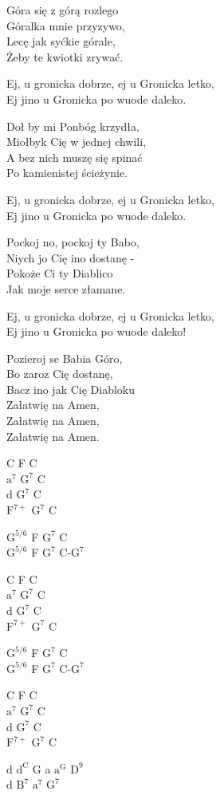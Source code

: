 \begin{textn}
    Góra się z górą rozlego\\
    Góralka mnie przyzywo,\\
    Lecę jak syćkie górale,\\
    Żeby te kwiotki  zrywać.

    Ej, u gronicka dobrze, ej u Gronicka letko,\\
    Ej jino u Gronicka po wuode daleko.

    Doł by mi Ponbóg krzydła,\\
    Miołbyk Cię w jednej chwili,\\
    A bez nich muszę się spinać\\
    Po kamienistej ścieżynie.

    Ej, u gronicka dobrze, ej u Gronicka letko,\\
    Ej jino u Gronicka po wuode daleko.

    Pockoj no, pockoj ty Babo,\\
    Niych jo Cię ino dostanę -\\
    Pokoże Ci ty Diablico\\
    Jak moje serce złamane.

    Ej, u gronicka dobrze, ej u Gronicka letko,\\
    Ej jino u Gronicka po wuode daleko!

    Pozieroj se Babia Góro,\\
    Bo zaroz Cię dostanę,\\
    Bacz ino jak Cię Diabloku\\
    Załatwię na Amen,\\
    Załatwię na Amen,\\
    Załatwię na Amen.
\end{textn}
\begin{chordw}
    C F C\\
    $\mathrm{a^7}$ $\mathrm{G^7}$ C\\
    d $\mathrm{G^7}$ C\\
    $\mathrm{F^{7+}}$ $\mathrm{G^7}$ C

    $\mathrm{G^{5/6}}$ F $\mathrm{G^7}$ C\\
    $\mathrm{G^{5/6}}$ F $\mathrm{G^7}$ C-$\mathrm{G^7}$

    C F C\\
    $\mathrm{a^7}$ $\mathrm{G^7}$ C\\
    d $\mathrm{G^7}$ C\\
    $\mathrm{F^{7+}}$ $\mathrm{G^7}$ C

    $\mathrm{G^{5/6}}$ F $\mathrm{G^7}$ C\\
    $\mathrm{G^{5/6}}$ F $\mathrm{G^7}$ C-$\mathrm{G^7}$

    C F C\\
    $\mathrm{a^7}$ $\mathrm{G^7}$ C\\
    d $\mathrm{G^7}$ C\\
    $\mathrm{F^{7+}}$ $\mathrm{G^7}$ C

    d $\mathrm{d^C}$ G a $\mathrm{a^G}$ $\mathrm{D^9}$\\
    d $\mathrm{B^7}$ $\mathrm{a^7}$ $\mathrm{G^7}$
\end{chordw}
